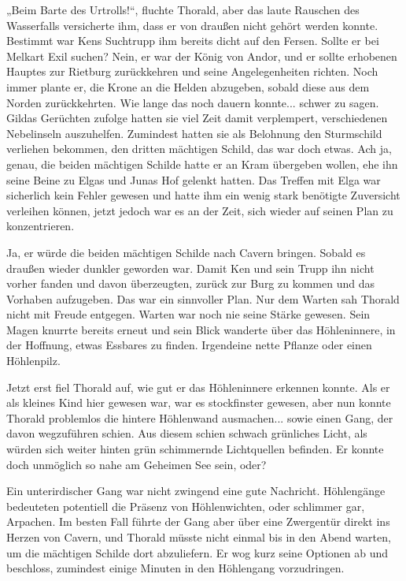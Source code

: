 \documentclass[10pt, a4paper, oneside]{book}
\begin{document}
„Beim Barte des Urtrolls!“, fluchte Thorald, aber das laute Rauschen des Wasserfalls versicherte ihm, dass er von draußen nicht gehört werden konnte. Bestimmt war Kens Suchtrupp ihm bereits dicht auf den Fersen. Sollte er bei Melkart Exil suchen? Nein, er war der König von Andor, und er sollte erhobenen Hauptes zur Rietburg zurückkehren und seine Angelegenheiten richten. Noch immer plante er, die Krone an die Helden abzugeben, sobald diese aus dem Norden zurückkehrten. Wie lange das noch dauern konnte... schwer zu sagen. Gildas Gerüchten zufolge hatten sie viel Zeit damit verplempert, verschiedenen Nebelinseln auszuhelfen. Zumindest hatten sie als Belohnung den Sturmschild verliehen bekommen, den dritten mächtigen Schild, das war doch etwas. Ach ja, genau, die beiden mächtigen Schilde hatte er an Kram übergeben wollen, ehe ihn seine Beine zu Elgas und Junas Hof gelenkt hatten. Das Treffen mit Elga war sicherlich kein Fehler gewesen und hatte ihm ein wenig stark benötigte Zuversicht verleihen können, jetzt jedoch war es an der Zeit, sich wieder auf seinen Plan zu konzentrieren.

Ja, er würde die beiden mächtigen Schilde nach Cavern bringen. Sobald es draußen wieder dunkler geworden war. Damit Ken und sein Trupp ihn nicht vorher fanden und davon überzeugten, zurück zur Burg zu kommen und das Vorhaben aufzugeben. Das war ein sinnvoller Plan. Nur dem Warten sah Thorald nicht mit Freude entgegen. Warten war noch nie seine Stärke gewesen. Sein Magen knurrte bereits erneut und sein Blick wanderte über das Höhleninnere, in der Hoffnung, etwas Essbares zu finden. Irgendeine nette Pflanze oder einen Höhlenpilz.

Jetzt erst fiel Thorald auf, wie gut er das Höhleninnere erkennen konnte. Als er als kleines Kind hier gewesen war, war es stockfinster gewesen, aber nun konnte Thorald problemlos die hintere Höhlenwand ausmachen... sowie einen Gang, der davon wegzuführen schien. Aus diesem schien schwach grünliches Licht, als würden sich weiter hinten grün schimmernde Lichtquellen befinden. Er konnte doch unmöglich so nahe am Geheimen See sein, oder?

Ein unterirdischer Gang war nicht zwingend eine gute Nachricht. Höhlengänge bedeuteten potentiell die Präsenz von Höhlenwichten, oder schlimmer gar, Arpachen. Im besten Fall führte der Gang aber über eine Zwergentür direkt ins Herzen von Cavern, und Thorald müsste nicht einmal bis in den Abend warten, um die mächtigen Schilde dort abzuliefern. Er wog kurz seine Optionen ab und beschloss, zumindest einige Minuten in den Höhlengang vorzudringen.
\end{document}
